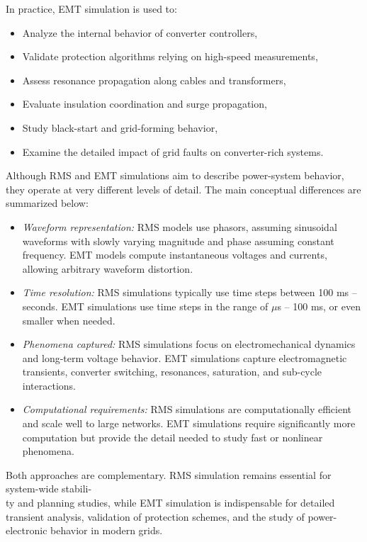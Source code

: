 In practice, EMT simulation is used to:
\begin{itemize}
    \item Analyze the internal behavior of converter controllers,
    \item Validate protection algorithms relying on high-speed measurements,
    \item Assess resonance propagation along cables and transformers,
    \item Evaluate insulation coordination and surge propagation,
    \item Study black-start and grid-forming behavior,
    \item Examine the detailed impact of grid faults on converter-rich systems.
\end{itemize}

Although RMS and EMT simulations aim to describe power-system behavior, they operate at very different levels of detail. 
The main conceptual differences are summarized below:
\begin{itemize}
    \item \textit{Waveform representation:}  
    RMS models use phasors, assuming sinusoidal waveforms with slowly varying magnitude and phase assuming constant frequency.  
    EMT models compute instantaneous voltages and currents, allowing arbitrary waveform distortion.

    \item \textit{Time resolution:}  
    RMS simulations typically use time steps between 100 ms -- seconds.
    EMT simulations use time steps in the range of $\mu$s -- 100 ms, or even smaller when needed.

    \item \textit{Phenomena captured:}  
    RMS simulations focus on electromechanical dynamics and long-term voltage behavior.  
    EMT simulations capture electromagnetic transients, converter switching, resonances, saturation, and sub-cycle interactions.

    \item \textit{Computational requirements:}  
    RMS simulations are computationally efficient and scale well to large networks.  
    EMT simulations require significantly more computation but provide the detail needed to study fast or nonlinear phenomena.
\end{itemize}

Both approaches are complementary. RMS simulation remains essential for system-wide stabili-\\ty and planning studies, 
while EMT simulation is indispensable for detailed transient analysis, validation of protection schemes, and the study of 
power-electronic behavior in modern grids.

